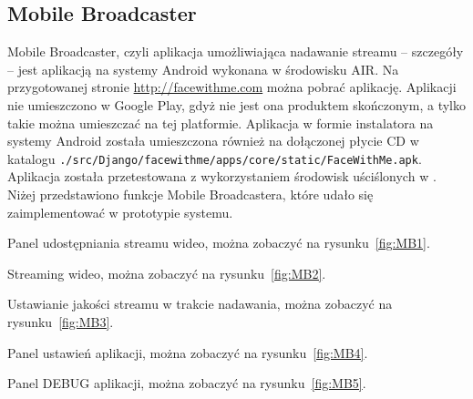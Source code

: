 \newpage
\subsection{Mobile Broadcaster}
Mobile Broadcaster, czyli aplikacja umożliwiająca nadawanie streamu -- szczegóły  -- jest aplikacją na systemy Android wykonana w środowisku AIR. Na przygotowanej stronie \url{http://facewithme.com} można pobrać aplikację. Aplikacji nie umieszczono w Google Play, gdyż nie jest ona produktem skończonym, a tylko takie można umieszczać na tej platformie. Aplikacja w formie instalatora na systemy Android została umieszczona również na dołączonej płycie CD w katalogu \texttt{./src/Django/facewithme/apps/core/static/FaceWithMe.apk}. Aplikacja została przetestowana z wykorzystaniem środowisk uściślonych w . Niżej przedstawiono funkcje Mobile Broadcastera, które udało się zaimplementować w prototypie systemu.

\begin{packed_item}
    \item{Panel udostępniania streamu wideo, można zobaczyć na rysunku~\ref{fig:MB1}.}
    \item{Streaming wideo, można zobaczyć na rysunku~\ref{fig:MB2}.}
    \item{Ustawianie jakości streamu w trakcie nadawania, można zobaczyć na rysunku~\ref{fig:MB3}.}
    \item{Panel ustawień aplikacji, można zobaczyć na rysunku~\ref{fig:MB4}.}
    \item{Panel DEBUG aplikacji, można zobaczyć na rysunku~\ref{fig:MB5}.}
\end{packed_item}

